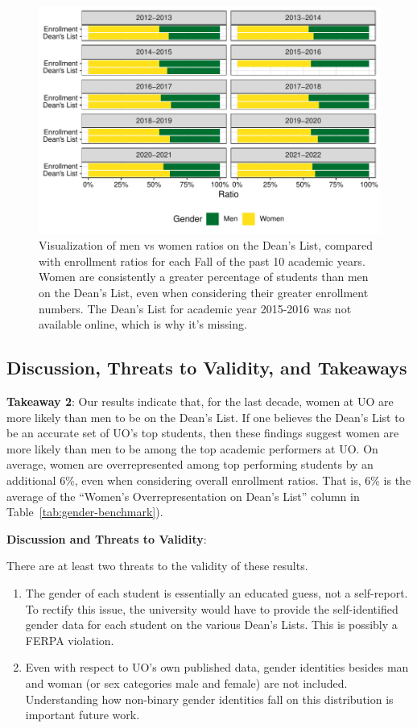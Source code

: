 \documentclass[10pt]{article}
\begin{document}
\begin{figure}[H]
	\centering
	\includegraphics[width=\linewidth]{../visualizations/gender3}
	\caption[Gender differences]{Visualization of men vs women ratios on the Dean's List, compared with enrollment ratios for each Fall of the past 10 academic years. Women are consistently a greater percentage of students than men on the Dean's List, even when considering their greater enrollment numbers. The Dean's List for academic year 2015-2016 was not available online, which is why it's missing.}
	\label{fig:gender}
\end{figure}


\subsection{Discussion, Threats to Validity, and Takeaways}

\textbf{Takeaway 2}: Our results indicate that, for the last decade, women at UO are more likely than men to be on the Dean's List. If one believes the Dean's List to be an accurate set of UO's top students, then these findings suggest women are more likely than men to be among the top academic performers at UO. On average, women are overrepresented among top performing students by an additional 6\%, even when considering overall enrollment ratios. That is, 6\% is the average of the ``Women's Overrepresentation on Dean's List'' column in Table~\ref{tab:gender-benchmark}).

\textbf{Discussion and Threats to Validity}:

There are at least two threats to the validity of these results.

\begin{enumerate}
	\item The gender of each student is essentially an educated guess, not a self-report. To rectify this issue, the university would have to provide the self-identified gender data for each student on the various Dean's Lists. This is possibly a FERPA violation.
	\item Even with respect to UO's own published data, gender identities besides man and woman (or sex categories male and female) are not included. Understanding how non-binary gender identities fall on this distribution is important future work.
\end{enumerate}
\end{document}
